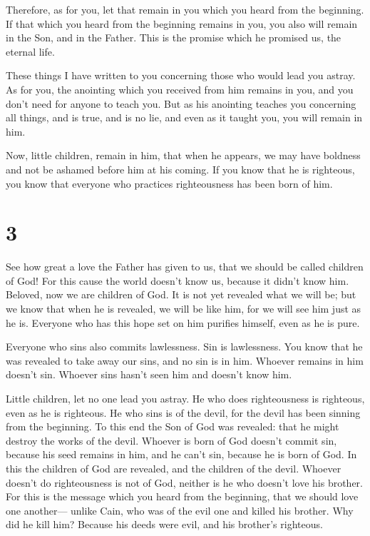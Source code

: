  Therefore, as for you, let that remain in you which you
heard from the beginning. If that which you heard from the beginning
remains in you, you also will remain in the Son, and in the Father.
 This is the promise which he promised us, the eternal
life.

 These things I have written to you concerning those who
would lead you astray.  As for you, the anointing which you
received from him remains in you, and you don't need for anyone to teach
you. But as his anointing teaches you concerning all things, and is
true, and is no lie, and even as it taught you, you will remain in him.

 Now, little children, remain in him, that when he appears,
we may have boldness and not be ashamed before him at his coming.
 If you know that he is righteous, you know that everyone
who practices righteousness has been born of him.

\hypertarget{section-2}{%
\section{3}\label{section-2}}

 See how great a love the Father has given to us, that we
should be called children of God! For this cause the world doesn't know
us, because it didn't know him.  Beloved, now we are
children of God. It is not yet revealed what we will be; but we know
that when he is revealed, we will be like him, for we will see him just
as he is.  Everyone who has this hope set on him purifies
himself, even as he is pure.

 Everyone who sins also commits lawlessness. Sin is
lawlessness.  You know that he was revealed to take away our
sins, and no sin is in him.  Whoever remains in him doesn't
sin. Whoever sins hasn't seen him and doesn't know him.

 Little children, let no one lead you astray. He who does
righteousness is righteous, even as he is righteous.  He who
sins is of the devil, for the devil has been sinning from the beginning.
To this end the Son of God was revealed: that he might destroy the works
of the devil.  Whoever is born of God doesn't commit sin,
because his seed remains in him, and he can't sin, because he is born of
God.  In this the children of God are revealed, and the
children of the devil. Whoever doesn't do righteousness is not of God,
neither is he who doesn't love his brother.  For this is
the message which you heard from the beginning, that we should love one
another---  unlike Cain, who was of the evil one and killed
his brother. Why did he kill him? Because his deeds were evil, and his
brother's righteous.

